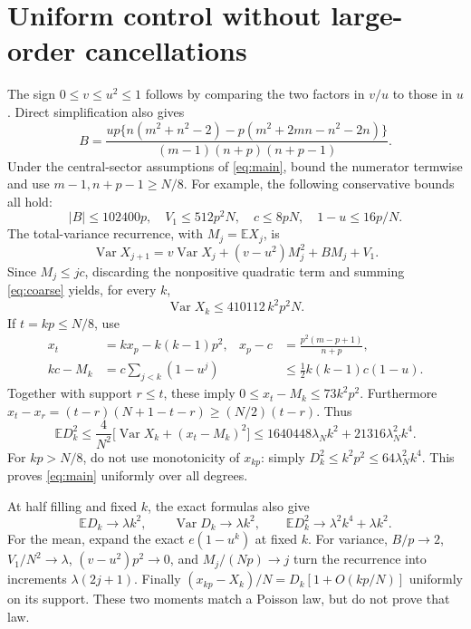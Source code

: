 \documentclass[11pt,a4paper]{article}
\newcommand{\EE}{\mathbb E}
\begin{document}
\newpage
\section{Uniform control without large-order cancellations}
The sign $0\le v\le u^2\le1$ follows by comparing the two factors
in $v/u$ to those in $u$. Direct simplification also gives
\begin{equation}
 B=\frac{up\{n(m^2+n^2-2)-p(m^2+2mn-n^2-2n)\}}
            {(m-1)(n+p)(n+p-1)}.
\end{equation}
Under the central-sector assumptions of \eqref{eq:main}, bound
the numerator termwise and use $m-1,n+p-1\ge N/8$. For example,
the following conservative bounds all hold:
\begin{equation}
 |B|\le102400p,\quad V_1\le512p^2N,\quad
 c\le8pN,\quad1-u\le16p/N.\label{eq:coarse}
\end{equation}
The total-variance recurrence, with $M_j=\EE X_j$, is
\begin{equation}
 \operatorname{Var}X_{j+1}
 =v\operatorname{Var}X_j+(v-u^2)M_j^2+BM_j+V_1.
\end{equation}
Since $M_j\le jc$, discarding the nonpositive quadratic term and
summing \eqref{eq:coarse} yields, for every $k$,
\begin{equation}
 \operatorname{Var}X_k\le410112\,k^2p^2N.\label{eq:variance}
\end{equation}
If $t=kp\le N/8$, use
\begin{align}
 x_t&=kx_p-k(k-1)p^2,&
 x_p-c&=\frac{p^2(m-p+1)}{n+p},\\
 kc-M_k&=c\sum_{j<k}(1-u^j)
 & &\le\tfrac12k(k-1)c(1-u).
\end{align}
Together with support $r\le t$, these imply
$0\le x_t-M_k\le73k^2p^2$.
Furthermore $x_t-x_r=(t-r)(N+1-t-r)\ge(N/2)(t-r)$.
Thus
\begin{equation}
 \EE D_k^2\le\frac4{N^2}\big[\operatorname{Var}X_k+(x_t-M_k)^2\big]
 \le1640448\lambda_Nk^2+21316\lambda_N^2k^4.
\end{equation}
For $kp>N/8$, do not use monotonicity of $x_{kp}$:
simply $D_k^2\le k^2p^2\le64\lambda_N^2k^4$.
This proves \eqref{eq:main} uniformly over all degrees.

At half filling and fixed $k$, the exact formulas also give
\begin{equation}
 \EE D_k\to\lambda k^2,\qquad
 \operatorname{Var}D_k\to\lambda k^2,\qquad
 \EE D_k^2\to\lambda^2k^4+\lambda k^2.\label{eq:DS}
\end{equation}
For the mean, expand the exact $e(1-u^k)$ at fixed $k$.
For variance, $B/p\to2$, $V_1/N^2\to\lambda$,
$(v-u^2)p^2\to0$, and $M_j/(Np)\to j$ turn the recurrence into
increments $\lambda(2j+1)$. Finally
$(x_{kp}-X_k)/N=D_k[1+O(kp/N)]$ uniformly on its support.
These two moments match a Poisson law, but do not prove that law.
\end{document}
